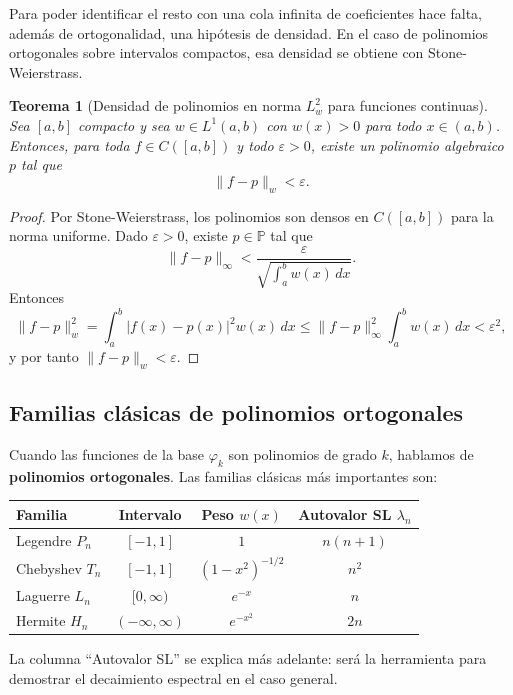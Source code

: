 \documentclass[a4paper,11pt]{report}
\newtheorem{theorem}{Teorema}[chapter]
\begin{document}
Para poder identificar el resto con una cola infinita de coeficientes hace falta, además de ortogonalidad, una hipótesis de densidad. En el caso de polinomios ortogonales sobre intervalos compactos, esa densidad se obtiene con Stone-Weierstrass.

\begin{theorem}[Densidad de polinomios en norma $L^2_w$ para funciones continuas]\label{thm:densidad_polinomios_stone_w}
Sea $[a,b]$ compacto y sea $w\in L^1(a,b)$ con $w(x)>0$ para todo $x\in(a,b)$. Entonces, para toda $f\in C([a,b])$ y todo $\varepsilon>0$, existe un polinomio algebraico $p$ tal que
\[
\|f-p\|_w<\varepsilon.
\]
\end{theorem}

\begin{proof}
Por Stone-Weierstrass, los polinomios son densos en $C([a,b])$ para la norma uniforme. Dado $\varepsilon>0$, existe $p\in\mathbb P$ tal que
\[
\|f-p\|_\infty < \frac{\varepsilon}{\sqrt{\int_a^b w(x)\,dx}}.
\]
Entonces
\[
\|f-p\|_w^2 = \int_a^b |f(x)-p(x)|^2w(x)\,dx
\le \|f-p\|_\infty^2\int_a^b w(x)\,dx < \varepsilon^2,
\]
y por tanto $\|f-p\|_w<\varepsilon$.
\end{proof}


\subsection{Familias clásicas de polinomios ortogonales}

Cuando las funciones de la base $\varphi_k$ son polinomios de grado $k$, hablamos de \textbf{polinomios ortogonales}.  Las familias clásicas más importantes son:

\begin{center}
\begin{tabular}{|l|c|c|c|}
\hline
\textbf{Familia} & \textbf{Intervalo} & \textbf{Peso} $w(x)$ & \textbf{Autovalor SL} $\lambda_n$ \\
\hline
Legendre $P_n$ & $[-1,1]$ & $1$ & $n(n+1)$ \\
Chebyshev $T_n$ & $[-1,1]$ & $(1-x^2)^{-1/2}$ & $n^2$ \\
Laguerre $L_n$ & $[0,\infty)$ & $e^{-x}$ & $n$ \\
Hermite $H_n$ & $(-\infty,\infty)$ & $e^{-x^2}$ & $2n$ \\
\hline
\end{tabular}
\end{center}

La columna ``Autovalor SL'' se explica más adelante: será la herramienta para demostrar el decaimiento espectral en el caso general.
\end{document}
